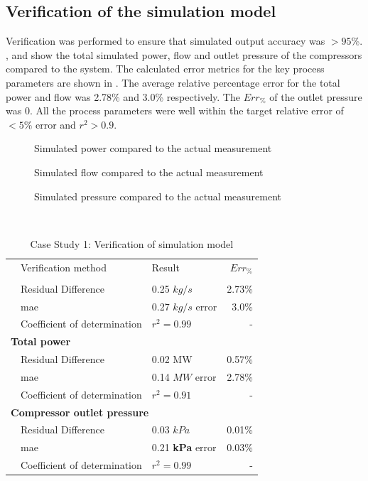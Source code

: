 \subsection{Verification of the simulation model}
Verification was performed to ensure that simulated output accuracy was $>95$\%. ,  and  show the total simulated power, flow and outlet pressure of the compressors compared to the system. The calculated error metrics for the key process parameters are shown in . The average relative percentage error for the total power and flow was 2.78\% and 3.0\% respectively. The $Err_{\%}$ of the outlet pressure was 0. All the process parameters were well within the target relative error of $ <5\% $ error and $r^2 > 0.9$. 
\begin{figure}[h!]
	\centering
	
	\caption{Simulated power compared to the actual measurement}
	\label{fig: Verification power Beatrix}
\end{figure}
\begin{figure}[h!]
	\centering
	
	\caption{Simulated flow compared to the actual measurement}
	\label{fig: Verification flow Beatrix}
\end{figure}
\begin{figure}[h!]
	\centering
	
	\caption{Simulated pressure compared to the actual measurement}
	\label{fig: Verification Pressure Beatrix}
\end{figure}\\
 \begin{table}[h!]
 	\caption{Case Study 1: Verification of simulation model}
	\centering
	\begin{tabular}{p{0.5cm}p{8cm}p{5cm}r}
		\hline
		&Verification method & Result & $Err_{\%}$\\
		\hhline{====}
		\multicolumn{4}{l}{\textbf{ Total Flow}}\\
		&Residual Difference  & 0.25 $kg/s$ & 2.73\% \\
		&\gls{mae} 					 & 0.27 $kg/s$ error & 3.0\% \\
		&Coefficient of determination & $r^2 =0.99$ & -\\ 
		\multicolumn{4}{l}{\textbf{ Total power}}\\
		&Residual Difference  & 0.02 MW & 0.57\% \\
		&\gls{mae} 					 & 0.14 $MW$ error & 2.78\% \\
		&Coefficient of determination & $r^2 =0.91$ & -\\ 
		\multicolumn{4}{l}{\textbf{ Compressor outlet pressure}}\\
		&Residual Difference  &0.03 $kPa$ & 0.01\% \\
		&\gls{mae} 					 & 0.21 \textbf{kPa} error & 0.03\% \\
		&Coefficient of determination & $r^2 =0.99$ & -\\
		\hline
	\end{tabular} 
	\label{Beet verification table}
\end{table}

